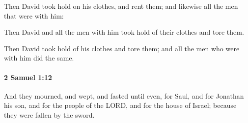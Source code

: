 			\begin{versebox}
					\item[BHS] 
					\item[ASV] Then David took hold on his clothes, and rent them; and likewise all the men that were with him:
					\item[NIV] Then David and all the men with him took hold of their clothes and tore them.
					\item[NRSV] Then David took hold of his clothes and tore them; and all the men who were with him did the same.
			\end{versebox}

		\paragraph{2 Samuel 1:12} %
			\label{2SAMUEL-1-12}

			And they mourned, and wept, and fasted until even, for Saul, and for Jonathan his son, and for the people of the LORD, and for the house of Israel; because they were fallen by the sword.


